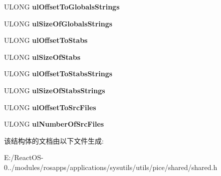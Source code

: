 \begin{DoxyCompactItemize}
\item 
\mbox{\label{struct___p_i_c_e___s_y_m_b_o_l_f_i_l_e___h_e_a_d_e_r_a3ad337d3a13e9d96a964fdeecb09c16d}} 
U\+L\+O\+NG {\bfseries ul\+Offset\+To\+Globals\+Strings}
\item 
\mbox{\label{struct___p_i_c_e___s_y_m_b_o_l_f_i_l_e___h_e_a_d_e_r_a0929148a3233b9651e042e0e22a165d6}} 
U\+L\+O\+NG {\bfseries ul\+Size\+Of\+Globals\+Strings}
\item 
\mbox{\label{struct___p_i_c_e___s_y_m_b_o_l_f_i_l_e___h_e_a_d_e_r_a520f8b19b982ea25b7251681f4cbd2e2}} 
U\+L\+O\+NG {\bfseries ul\+Offset\+To\+Stabs}
\item 
\mbox{\label{struct___p_i_c_e___s_y_m_b_o_l_f_i_l_e___h_e_a_d_e_r_ab16924e6931f8846b30d97406933bb3b}} 
U\+L\+O\+NG {\bfseries ul\+Size\+Of\+Stabs}
\item 
\mbox{\label{struct___p_i_c_e___s_y_m_b_o_l_f_i_l_e___h_e_a_d_e_r_a83db91b324701c47d76c7b8c19401b9e}} 
U\+L\+O\+NG {\bfseries ul\+Offset\+To\+Stabs\+Strings}
\item 
\mbox{\label{struct___p_i_c_e___s_y_m_b_o_l_f_i_l_e___h_e_a_d_e_r_a01964e3a0d78bcda975f826149b2adb0}} 
U\+L\+O\+NG {\bfseries ul\+Size\+Of\+Stabs\+Strings}
\item 
\mbox{\label{struct___p_i_c_e___s_y_m_b_o_l_f_i_l_e___h_e_a_d_e_r_afdff054c26026761da21ffab1a180534}} 
U\+L\+O\+NG {\bfseries ul\+Offset\+To\+Src\+Files}
\item 
\mbox{\label{struct___p_i_c_e___s_y_m_b_o_l_f_i_l_e___h_e_a_d_e_r_a9f1d364377aa52602719dbf7cca2b9d8}} 
U\+L\+O\+NG {\bfseries ul\+Number\+Of\+Src\+Files}
\end{DoxyCompactItemize}


该结构体的文档由以下文件生成\+:\begin{DoxyCompactItemize}
\item 
E\+:/\+React\+O\+S-\/0../modules/rosapps/applications/sysutils/utils/pice/shared/shared.\+h\end{DoxyCompactItemize}
